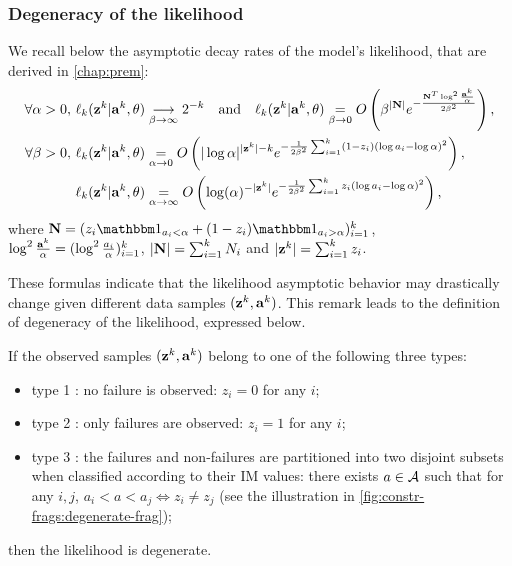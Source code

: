 \subsubsection{Degeneracy of the likelihood}

We recall below the asymptotic decay rates of the model's likelihood, that are derived in   \cref{chap:prem}:
\begin{align}
    \forall\alpha>0,\, \ell_k(\mathbf{z}^k|\mathbf{a}^k,\theta) &\overset{\ }{\underset{\beta\rightarrow\infty}{\longrightarrow}}2^{-k}\quad\text{and}\quad
        \ell_k(\mathbf{z}^k|\mathbf{a}^k,\theta) \overset{}{\underset{\beta\rightarrow0}{=}}O\left(\beta^{|\mathbf{N}|}e^{-\frac{\mathbf{N}^T\log^2\frac{\mathbf{a}^k}{\alpha}}{2\beta^2}}\right) ,\\
    \forall\beta>0,\, \ell_k(\mathbf{z}^k|\mathbf{a}^k,\theta)  &\overset{}{\underset{\alpha\rightarrow0}{=}}  O\left(|\log\alpha|^{|\mathbf{z}^k|-k} e^{-\frac{1}{2\beta^2}\sum_{i=1}^k (1-z_i)(\log a_i-\log\alpha)^2} \right),\\
    \ell_k(\mathbf{z}^k|\mathbf{a}^k,\theta) &\overset{}{\underset{\alpha\rightarrow\infty}{=}}  O\left(\log(\alpha)^{-|\mathbf{z}^k|} e^{-\frac{1}{2\beta^2}\sum_{i=1}^k z_i(\log a_i-\log\alpha)^2} \right) ,
\end{align}
where $\mbf N=(z_i\indic_{a_i<\alpha}+(1-z_i)\indic_{a_i>\alpha})_{i=1}^k$, $\log^2\frac{\mathbf{a}^k}{\alpha}=(\log^2\frac{a_i}{\alpha})_{i=1}^k$, 
    $|\mathbf{N}|=\sum_{i=1}^kN_i$ and
    $|\mathbf{z}^k|=\sum_{i=1}^kz_i$. %

%
These formulas indicate that the likelihood asymptotic behavior may drastically change given different data samples $(\mathbf{z}^k,\mathbf{a}^k)$.
This remark leads to the definition of degeneracy of the likelihood, expressed below.


\begin{defi}\label{def:constr-frag:degeneracy}
    If the observed samples $(\mathbf{z}^k,\mathbf{a}^k)$ belong to one of the following three types:
    \begin{itemize}
        \item
        type 1 : no failure is observed: $z_i=0$ for any $i$;
        \item type 2 : only failures are observed: $z_i=1$ for any $i$;
        \item type 3 : the failures and non-failures are partitioned into two disjoint subsets when classified according to their IM values:
        there exists $a\in\mathcal{A}$ such that for any $i,j$, $a_i<a<a_j\Longleftrightarrow z_i\ne z_j$ (see the illustration in \cref{fig:constr-frags:degenerate-frag});
    \end{itemize}
    then the likelihood is degenerate.
\end{defi}


